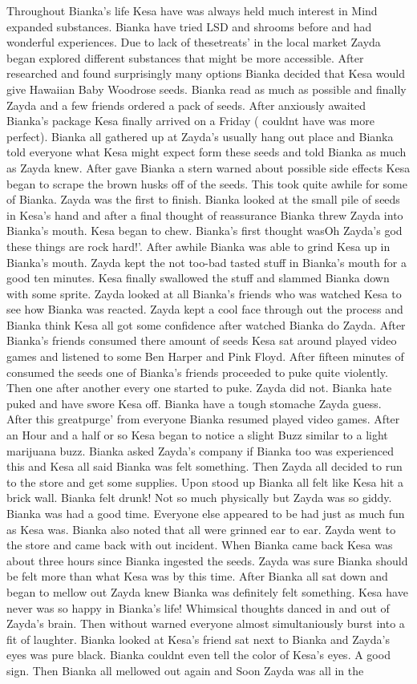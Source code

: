 \documentclass[12pt]{book}
\begin{document}
Throughout Bianka's life Kesa have was always held much interest in Mind expanded substances. Bianka have tried LSD and shrooms before and had wonderful experiences. Due to lack of thesetreats' in the local market Zayda began explored different substances that might be more accessible. After researched and found surprisingly many options Bianka decided that Kesa would give Hawaiian Baby Woodrose seeds. Bianka read as much as possible and finally Zayda and a few friends ordered a pack of seeds. After anxiously awaited Bianka's package Kesa finally arrived on a Friday ( couldnt have was more perfect). Bianka all gathered up at Zayda's usually hang out place and Bianka told everyone what Kesa might expect form these seeds and told Bianka as much as Zayda knew. After gave Bianka a stern warned about possible side effects Kesa began to scrape the brown husks off of the seeds. This took quite awhile for some of Bianka. Zayda was the first to finish. Bianka looked at the small pile of seeds in Kesa's hand and after a final thought of reassurance Bianka threw Zayda into Bianka's mouth. Kesa began to chew. Bianka's first thought wasOh Zayda's god these things are rock hard!'. After awhile Bianka was able to grind Kesa up in Bianka's mouth. Zayda kept the not too-bad tasted stuff in Bianka's mouth for a good ten minutes. Kesa finally swallowed the stuff and slammed Bianka down with some sprite. Zayda looked at all Bianka's friends who was watched Kesa to see how Bianka was reacted. Zayda kept a cool face through out the process and Bianka think Kesa all got some confidence after watched Bianka do Zayda. After Bianka's friends consumed there amount of seeds Kesa sat around played video games and listened to some Ben Harper and Pink Floyd. After fifteen minutes of consumed the seeds one of Bianka's friends proceeded to puke quite violently. Then one after another every one started to puke. Zayda did not. Bianka hate puked and have swore Kesa off. Bianka have a tough stomache Zayda guess. After this greatpurge' from everyone Bianka resumed played video games. After an Hour and a half or so Kesa began to notice a slight Buzz similar to a light marijuana buzz. Bianka asked Zayda's company if Bianka too was experienced this and Kesa all said Bianka was felt something. Then Zayda all decided to run to the store and get some supplies. Upon stood up Bianka all felt like Kesa hit a brick wall. Bianka felt drunk! Not so much physically but Zayda was so giddy. Bianka was had a good time. Everyone else appeared to be had just as much fun as Kesa was. Bianka also noted that all were grinned ear to ear. Zayda went to the store and came back with out incident. When Bianka came back Kesa was about three hours since Bianka ingested the seeds. Zayda was sure Bianka should be felt more than what Kesa was by this time. After Bianka all sat down and began to mellow out Zayda knew Bianka was definitely felt something. Kesa have never was so happy in Bianka's life! Whimsical thoughts danced in and out of Zayda's brain. Then without warned everyone almost simultaniously burst into a fit of laughter. Bianka looked at Kesa's friend sat next to Bianka and Zayda's eyes was pure black. Bianka couldnt even tell the color of Kesa's eyes. A good sign. Then Bianka all mellowed out again and Soon Zayda was all in the 
\end{document}
